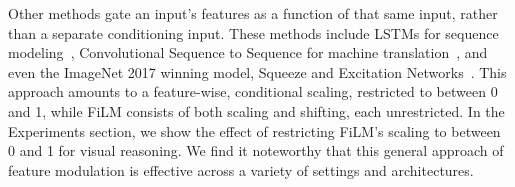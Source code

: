 \documentclass[letterpaper]{article} \usepackage{aaai18}  \usepackage{times}  \usepackage{helvet}  \usepackage{courier}  \usepackage{url}  \usepackage{graphicx}  \frenchspacing  \setlength{\pdfpagewidth}{8.5in}  \setlength{\pdfpageheight}{11in}
\begin{document}
    Other methods gate an input's features as a function of that same input, rather than a separate conditioning input. These methods include LSTMs for sequence modeling~\cite{LSTM}, Convolutional Sequence to Sequence for machine translation~\cite{pmlr-v70-gehring17a}, and even the ImageNet 2017 winning model, Squeeze and Excitation Networks~\cite{hu2017}. This approach amounts to a feature-wise, conditional scaling, restricted to between 0 and 1, while FiLM consists of both scaling and shifting, each unrestricted. In the Experiments section, we show the effect of restricting FiLM's scaling to between 0 and 1 for visual reasoning. We find it noteworthy that this general approach of feature modulation is effective across a variety of settings and architectures.
    
        \begin{table*}[t]
        \centering
        

\end{table*}
\end{document}
